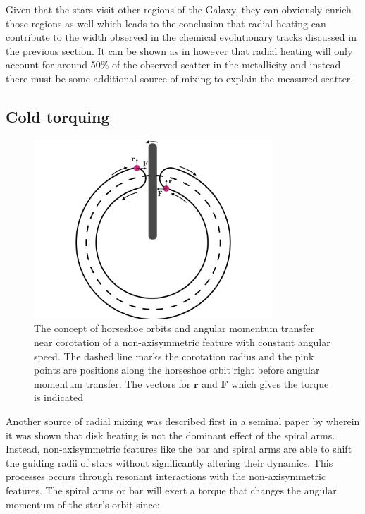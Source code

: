 Given that the stars visit other regions of the Galaxy, they can obviously enrich those regions as well which leads to the conclusion that radial heating can contribute to the width observed in the chemical evolutionary tracks discussed in the previous section. It can be shown as in \cite{binney:07} however that radial heating will only account for around 50\% of the observed scatter in the metallicity and instead there must be some additional source of mixing to explain the measured scatter. 

\subsection{Cold torquing}
\begin{figure}[t]
    \centering
    \includegraphics[width=0.8\textwidth]{images/torquing.pdf}
    \caption{The concept of horseshoe orbits and angular momentum transfer near corotation of a non-axisymmetric feature with constant angular speed. The dashed line marks the corotation radius and the pink points are positions along the horseshoe orbit right before angular momentum transfer. The vectors for $\pmb{r}$ and $\pmb{F}$ which gives the torque is indicated} %
    \label{fig:torquing}
\end{figure}
Another source of radial mixing was described first in a seminal paper by \cite{sellwood:02} wherein it was shown that disk heating is not the dominant effect of the spiral arms. Instead, non-axisymmetric features like the bar and spiral arms are able to shift the guiding radii of stars without significantly altering their dynamics. This processes occurs through resonant interactions with the non-axisymmetric features. The spiral arms or bar will exert a torque that changes the angular momentum of the star's orbit since:
